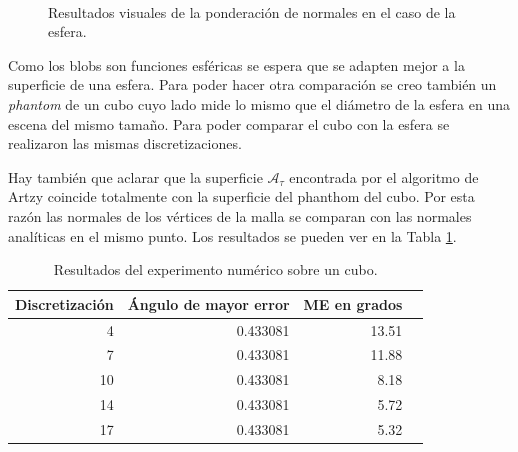 \begin{figure}[htp]
\begin{center}
     \\
  \end{center}
  \caption[Resultados visuales de la ponderación de normales en el caso de la esfera]{Resultados visuales de la ponderación de normales en el caso de la esfera.}
  \label{fig:nomalesEsfera}
\end{figure}

Como los blobs son funciones esféricas se espera que se adapten mejor a la superficie de una esfera. Para poder hacer otra comparación se creo también un \emph{phantom} de un cubo cuyo lado mide lo mismo que el diámetro de la esfera en una escena del mismo tamaño. Para poder comparar el cubo con la esfera se realizaron las mismas discretizaciones.

Hay también que aclarar que la superficie $\mathcal{A}_{\tau}$ encontrada por el algoritmo de Artzy coincide totalmente con la superficie del phanthom del cubo. Por esta razón las normales de los vértices de la malla se comparan con las normales analíticas en el mismo punto. Los resultados se pueden ver en la Tabla \ref{table:cubo}.

\begin{table}[htp]
\begin{center}
  \begin{tabular}{|r|r|r|r|}
    \hline
    Discretización & Ángulo de mayor error & ME en grados\\ 
    \hline
      4 & 0.433081 & 13.51 \\
      7 & 0.433081 & 11.88 \\
     10 & 0.433081 &  8.18 \\
     14 & 0.433081 &  5.72 \\
     17 & 0.433081 &  5.32 \\
    \hline
  \end{tabular}
\end{center}
\caption[Resultados del experimento numérico sobre un cubo]{Resultados del experimento numérico sobre un cubo.}
\label{table:cubo}
\end{table}

